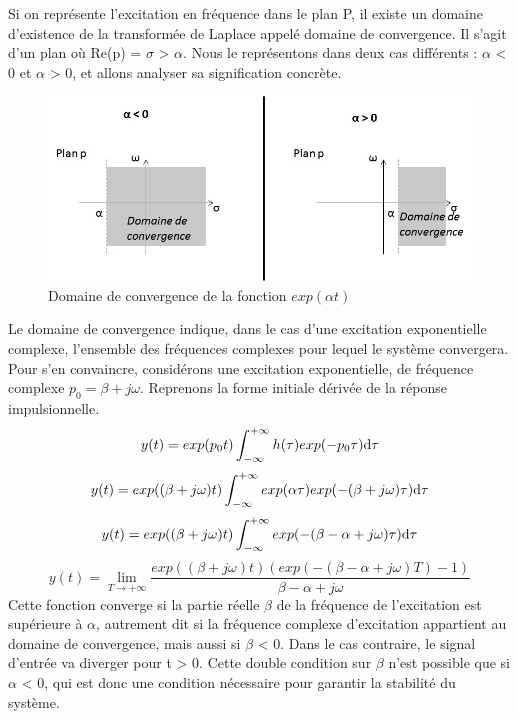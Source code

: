 	Si on représente l'excitation en fréquence dans le plan P, il existe un
	domaine d'existence de la transformée de Laplace appelé domaine de
	convergence. Il s'agit d'un plan où Re(p) = $\sigma $ \textgreater{} $\alpha $. Nous le
	représentons dans deux cas différents :  $\alpha $ \textless{} 0 et  $\alpha $
	\textgreater{} 0, et allons analyser sa signification concrète.
	\begin{figure}[h!]
		\centering
		\includegraphics[scale=0.8]{images/Domaine_convergence_exp_at.jpg}
		\caption{Domaine de convergence de la fonction $exp(\alpha t)$}	
		\label{Fig:Domaine_convergence_exp_at} 
	\end{figure}
	Le domaine de convergence indique, dans le cas d'une excitation
	exponentielle complexe, l'ensemble des fréquences complexes pour lequel
	le système convergera. Pour s'en
	convaincre, considérons une excitation exponentielle, de fréquence
	complexe $p_{0} =  \beta +j \omega $. Reprenons la forme initiale dérivée de la réponse	impulsionnelle.
	\begin{equation*}
	y(t) = exp(p_{0}t)\int_{-\infty}^{+\infty}h(\tau)exp(-p_{0}\tau) \mathrm{d} \tau 
	\end{equation*}
	\begin{equation*}
	y(t) = exp((\beta+j\omega)t)\int_{-\infty}^{+\infty}exp(\alpha \tau)exp(-(\beta+j\omega)\tau) \mathrm{d} \tau 
	\end{equation*}
	\begin{equation*}
	y(t) = exp((\beta+j\omega)t)\int_{-\infty}^{+\infty}exp(-(\beta-\alpha+j\omega)\tau) \mathrm{d} \tau 
	\end{equation*}
	\begin{equation}
	y(t) = \lim_{T \to +\infty} \frac{exp((\beta+j\omega)t)(exp(-(\beta-\alpha+j\omega)T)-1)}{\beta-\alpha+j\omega} 
	\end{equation}
	Cette fonction converge si la partie réelle $\beta $ de la fréquence de
	l'excitation est supérieure à  $\alpha $, autrement dit si la fréquence complexe
	d'excitation appartient au domaine de convergence, mais aussi si $\beta $
	\textless{} 0. Dans le cas contraire, le signal d'entrée va diverger pour
	t \textgreater{} 0. Cette double condition sur $\beta $ n'est possible que si $\alpha $
	\textless{} 0, qui est donc une condition nécessaire pour garantir la stabilité du système.\\
	

